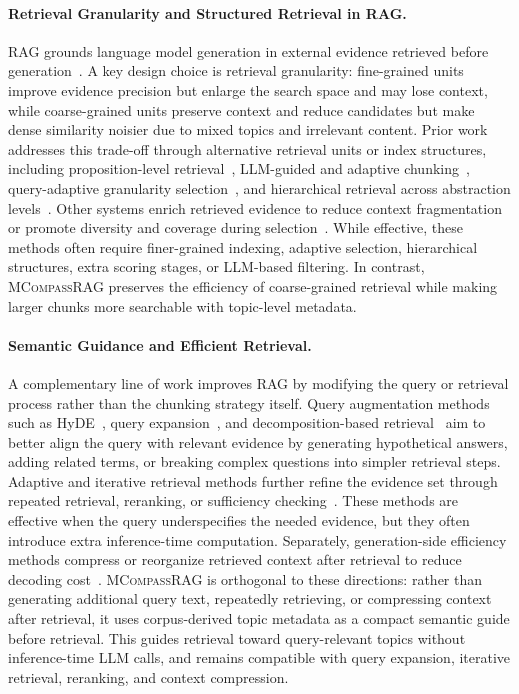 \documentclass{llmxive}
\providecommand{\name}[1]{\textsc{MCompassRAG}\xspace}
\begin{document}
\paragraph{Retrieval Granularity and Structured Retrieval in RAG.}
RAG grounds language model generation in external evidence retrieved before generation~\cite{lewis2020retrieval, karpukhin-etal-2020-dense, izacard-grave-2021-leveraging}. A key design choice is retrieval granularity: fine-grained units improve evidence precision but enlarge the search space and may lose context, while coarse-grained units preserve context and reduce candidates but make dense similarity noisier due to mixed topics and irrelevant content. Prior work addresses this trade-off through alternative retrieval units or index structures, including proposition-level retrieval~\cite{chen-etal-2024-dense}, LLM-guided and adaptive chunking~\cite{zhao2024meta, zhao-etal-2025-moc}, query-adaptive granularity selection~\cite{zhang2026smartchunk}, and hierarchical retrieval across abstraction levels~\cite{sarthi2024raptor}. Other systems enrich retrieved evidence to reduce context fragmentation~\cite{tao-etal-2025-saki} or promote diversity and coverage during selection~\cite{khan-etal-2026-df}. While effective, these methods often require finer-grained indexing, adaptive selection, hierarchical structures, extra scoring stages, or LLM-based filtering. In contrast, \name{} preserves the efficiency of coarse-grained retrieval while making larger chunks more searchable with topic-level metadata.

\paragraph{Semantic Guidance and Efficient Retrieval. }
A complementary line of work improves RAG by modifying the query or retrieval process rather than the chunking strategy itself. Query augmentation methods such as HyDE~\cite{gao-etal-2023-precise}, query expansion~\cite{wang-etal-2023-query2doc, zhou-etal-2024-hyqe}, and decomposition-based retrieval~\cite{trivedi-etal-2023-interleaving, zheng2024take} aim to better align the query with relevant evidence by generating hypothetical answers, adding related terms, or breaking complex questions into simpler retrieval steps. Adaptive and iterative retrieval methods further refine the evidence set through repeated retrieval, reranking, or sufficiency checking~\cite{verma-etal-2026-reflectiverag}. These methods are effective when the query underspecifies the needed evidence, but they often introduce extra inference-time computation. Separately, generation-side efficiency methods compress or reorganize retrieved context after retrieval to reduce decoding cost~\cite{lin2025refrag, louis2026oscar}. \name{} is orthogonal to these directions: rather than generating additional query text, repeatedly retrieving, or compressing context after retrieval, it uses corpus-derived topic metadata as a compact semantic guide before retrieval. This guides retrieval toward query-relevant topics without inference-time LLM calls, and remains compatible with query expansion, iterative retrieval, reranking, and context compression.
\end{document}
